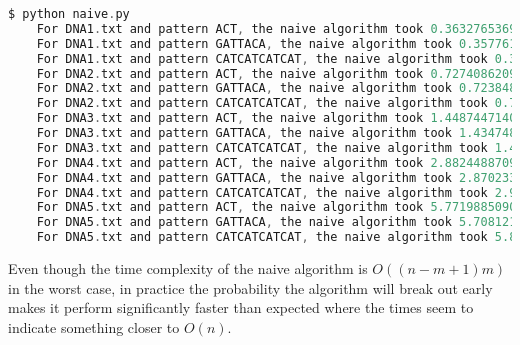 \documentclass[12pt]{article}
\newenvironment{problem}[2][Problem]{\begin{trivlist}
\item[\hskip \labelsep {\bfseries #1}\hskip \labelsep {\bfseries #2.}]}{\end{trivlist}}
\begin{document}
\begin{problem}{1}
\begin{lstlisting}[language=C, caption=Terminal output running code]
$ python naive.py
    For DNA1.txt and pattern ACT, the naive algorithm took 0.3632765369984554 seconds with 65495 matches
    For DNA1.txt and pattern GATTACA, the naive algorithm took 0.3577618750023248 seconds with 242 matches
    For DNA1.txt and pattern CATCATCATCAT, the naive algorithm took 0.3621113970002625 seconds with 0 matches
    For DNA2.txt and pattern ACT, the naive algorithm took 0.727408620998176 seconds with 131034 matches
    For DNA2.txt and pattern GATTACA, the naive algorithm took 0.7238480179985345 seconds with 491 matches
    For DNA2.txt and pattern CATCATCATCAT, the naive algorithm took 0.7162508259971219 seconds with 1 matches
    For DNA3.txt and pattern ACT, the naive algorithm took 1.4487447140018048 seconds with 262192 matches
    For DNA3.txt and pattern GATTACA, the naive algorithm took 1.4347486420010682 seconds with 1002 matches
    For DNA3.txt and pattern CATCATCATCAT, the naive algorithm took 1.4541748980009288 seconds with 1 matches
    For DNA4.txt and pattern ACT, the naive algorithm took 2.882448870997905 seconds with 524454 matches
    For DNA4.txt and pattern GATTACA, the naive algorithm took 2.870233528999961 seconds with 1976 matches
    For DNA4.txt and pattern CATCATCATCAT, the naive algorithm took 2.910066188000201 seconds with 5 matches
    For DNA5.txt and pattern ACT, the naive algorithm took 5.771988509000948 seconds with 1050689 matches
    For DNA5.txt and pattern GATTACA, the naive algorithm took 5.708121202998882 seconds with 4161 matches
    For DNA5.txt and pattern CATCATCATCAT, the naive algorithm took 5.878649592999864 seconds with 3 matches
\end{lstlisting}
Even though the time complexity of the naive algorithm is $O((n-m+1)m)$ in the worst case, in practice the probability the algorithm will break out early makes it perform significantly faster than expected where the times seem to indicate something closer to $O(n)$.
\end{problem}
\pagebreak
\end{document}
